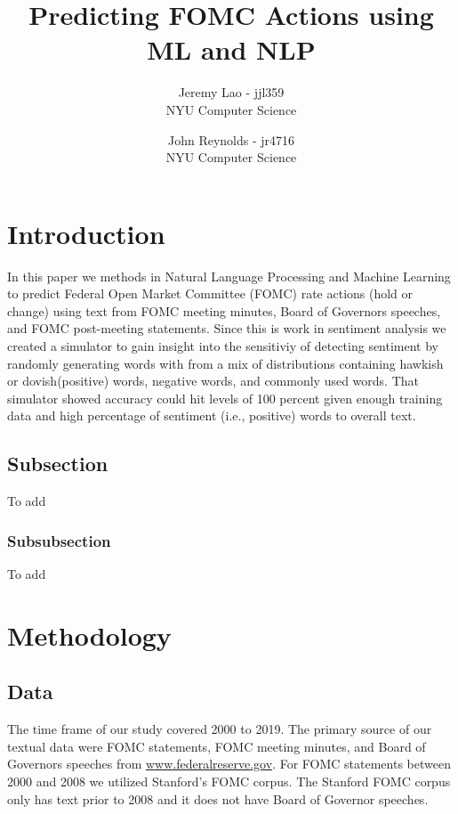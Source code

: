 \documentclass{article}
\title{Predicting FOMC Actions using ML and NLP}
\author{
        Jeremy Lao - jjl359 \\
        NYU Computer Science \\
            \and
        John Reynolds - jr4716 \\
        NYU Computer Science \\
}
\begin{document}
\maketitle


\section{Introduction}
In this paper we methods in Natural Language Processing and Machine Learning to predict Federal Open Market Committee (FOMC) rate actions (hold or change) using text from FOMC meeting minutes, Board of Governors speeches, and FOMC post-meeting statements.  Since this is work in sentiment analysis we created a simulator to gain insight into the sensitiviy of detecting sentiment by randomly generating words with from a mix of distributions containing hawkish or dovish(positive) words, negative words, and commonly used words.  That simulator showed accuracy could hit levels of 100 percent given enough training data and high percentage of sentiment (i.e., positive)  words to overall text.



\subsection{Subsection}\label{sec:nothing}

To add

\subsubsection{Subsubsection}\label{sec:nothing2}

To add

\section{Methodology}

\subsection{Data}

The time frame of our study covered 2000 to 2019.  The primary source of our textual data were FOMC statements, FOMC meeting minutes, and Board of Governors speeches from \url{www.federalreserve.gov}.  For FOMC statements between 2000 and 2008 we utilized Stanford's FOMC corpus.  The Stanford FOMC corpus only has text prior to 2008 and it does not have Board of Governor speeches.  \vspace{5mm}
\end{document}
